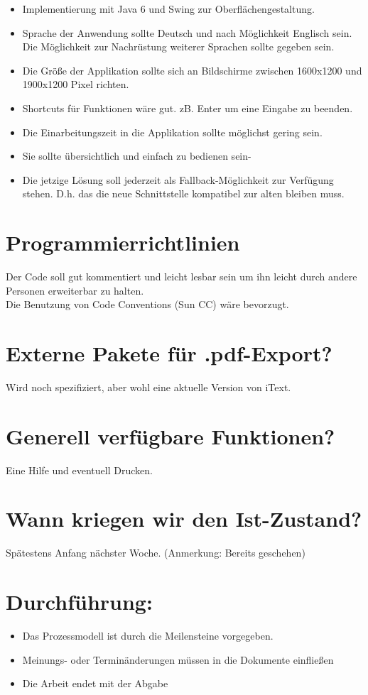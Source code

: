 \documentclass[a4paper]{scrartcl}
\begin{document}
        \begin{itemize}        
            \item Implementierung mit Java 6 und Swing zur Oberflächengestaltung.
            \item Sprache der Anwendung sollte Deutsch und nach Möglichkeit Englisch sein. Die Möglichkeit zur Nachrüstung weiterer Sprachen sollte gegeben sein.
            \item Die Größe der Applikation sollte sich an Bildschirme zwischen 1600x1200 und 1900x1200 Pixel richten.
            \item Shortcuts für Funktionen wäre gut. zB. Enter um eine Eingabe zu beenden.
            \item Die Einarbeitungszeit in die Applikation sollte möglichst gering sein.
            \item Sie sollte übersichtlich und einfach zu bedienen sein-
            \item Die jetzige Lösung soll jederzeit als Fallback-Möglichkeit zur Verfügung stehen. D.h. das die neue Schnittstelle kompatibel zur alten bleiben muss.
        \end{itemize}

    \section*{Programmierrichtlinien}
        Der Code soll gut kommentiert und leicht lesbar sein um ihn leicht durch andere Personen erweiterbar zu halten. \\
        Die Benutzung von Code Conventions (Sun CC) wäre bevorzugt.

    \section*{Externe Pakete für .pdf-Export?}
        Wird noch spezifiziert, aber wohl eine aktuelle Version von iText.

    \section*{Generell verfügbare Funktionen?}
     Eine Hilfe und eventuell Drucken.

    \section*{Wann kriegen wir den Ist-Zustand?}
        Spätestens Anfang nächster Woche. (Anmerkung: Bereits geschehen)

    \section*{Durchführung:}
        \begin{itemize}
            \item Das Prozessmodell ist durch die Meilensteine vorgegeben.
            \item Meinungs- oder Terminänderungen müssen in die Dokumente einfließen
            \item Die Arbeit endet mit der Abgabe
        \end{itemize}
\end{document}
